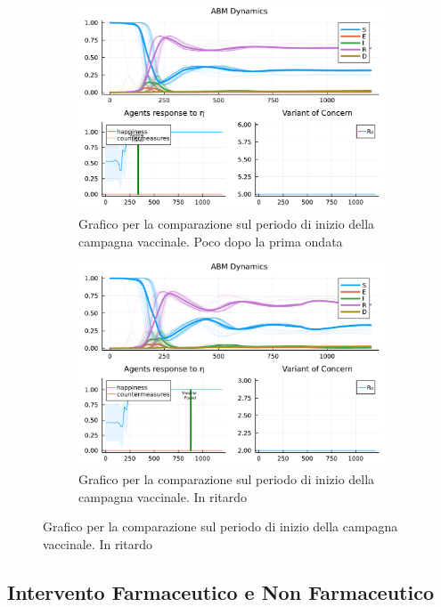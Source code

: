 \begin{figure}[!hb]
\begin{subfigure}[b]{0.45\textwidth}
		\includegraphics[width=\textwidth]{img/SocialNetworkABM_5_V.pdf}
		\caption{Grafico per la comparazione sul periodo di inizio della campagna vaccinale. Poco dopo la prima ondata}
		\label{fig:comparison_vax_3}
	\end{subfigure}
	\hfill
	\begin{subfigure}[b]{0.45\textwidth}
		\centering
		\includegraphics[width=\textwidth]{img/SocialNetworkABM_2_V.pdf}
		\caption{Grafico per la comparazione sul periodo di inizio della campagna vaccinale. In ritardo}
		\label{fig:comparison_vax_4}
	\end{subfigure}
\end{figure}

\subsection{Intervento Farmaceutico e Non Farmaceutico}

